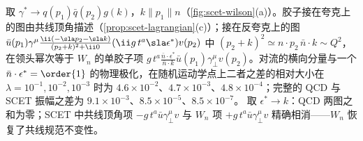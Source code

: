 \begin{example}[$W_n$ 的树图匹配]\label{ex:scet-wn-tree}
取 $\gamma^*\to q(p_1)\bar q(p_2)g(k)$，$k\parallel p_1\parallel n$（\cref{fig:scet-wilson}(a)）。胶子接在夸克上的图由共线顶角描述（\cref{prop:scet-lagrangian}(c)）；接在反夸克上的图 $\bar u(p_1)\gamma^\mu\frac{\ii(-\sla p_2-\sla k)}{(p_2+k)^2+\ii0}(\ii g\,t^a\sla\epsilon^*)v(p_2)$ 中 $(p_2+k)^2\simeq n\cdot p_2\,\bar n\cdot k\sim Q^2$，在领头幂次等于 $W_n$ 的单胶子项 $g\,t^a\frac{\bar n\cdot\epsilon^*}{\bar n\cdot k}\bar u(p_1)\gamma_\perp^\mu v(p_2)$。对流的横向分量与一个 $\bar n\cdot\epsilon^*=\order{1}$ 的物理极化，在随机运动学点上二者之差的相对大小在 $\lambda=10^{-1},10^{-2},10^{-3}$ 时为 $4.6\times10^{-2}$、$4.7\times10^{-3}$、$4.8\times10^{-4}$；完整的 QCD 与 SCET 振幅之差为 $9.1\times10^{-3}$、$8.5\times10^{-5}$、$8.5\times10^{-7}$。%
取 $\epsilon^*\to k$：QCD 两图之和为零；SCET 中共线顶角项 $-g\,t^a\bar u\gamma_\perp^\mu v$ 与 $W_n$ 项 $+g\,t^a\bar u\gamma_\perp^\mu v$ 精确相消——$W_n$ 恢复了共线规范不变性。
\end{example}
